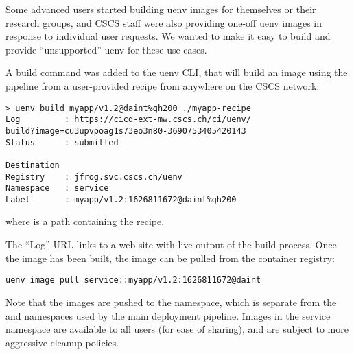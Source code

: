 Some advanced users started building uenv images for themselves or their research groups, and CSCS staff were also providing one-off uenv images in response to individual user requests.
We wanted to make it easy to build and provide ``unsupported'' uenv for these use cases.

A build command was added to the uenv CLI, that will build an image using the pipeline from a user-provided recipe from anywhere on the CSCS network:
\begin{lstlisting}
> uenv build myapp/v1.2@daint%gh200 ./myapp-recipe
Log         : https://cicd-ext-mw.cscs.ch/ci/uenv/
build?image=cu3upvpoag1s73eo3n80-3690753405420143
Status      : submitted

Destination
Registry    : jfrog.svc.cscs.ch/uenv
Namespace   : service
Label       : myapp/v1.2:1626811672@daint%gh200
\end{lstlisting}
where  is a path containing the recipe.

The ``Log'' URL links to a web site with live output of the build process.
Once the image has been built, the image can be pulled from the container registry:
\begin{lstlisting}
uenv image pull service::myapp/v1.2:1626811672@daint
\end{lstlisting}
Note that the images are pushed to the  namespace, which is separate from the  and  namespaces used by the main deployment pipeline.
Images in the service namespace are available to all users (for ease of sharing), and are subject to more aggressive cleanup policies.




